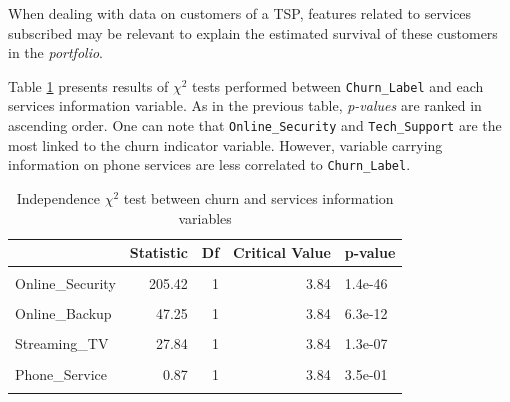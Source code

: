 \documentclass[
]{book}
\begin{document}
When dealing with data on customers of a TSP, features related to services subscribed may be relevant to explain the estimated survival of these customers in the \emph{portfolio}.

Table \ref{tab:chi2services} presents results of \(\chi^2\) tests performed between \texttt{Churn\_Label} and each services information variable. As in the previous table, \emph{p-values} are ranked in ascending order. One can note that \texttt{Online\_Security} and \texttt{Tech\_Support} are the most linked to the churn indicator variable. However, variable carrying information on phone services are less correlated to \texttt{Churn\_Label}.

\begin{table}[H]

\caption{\label{tab:chi2services}Independence $\chi^2$ test between churn and services information variables}
\centering
\begin{tabular}[t]{lrrrl}
\toprule
  & Statistic & Df & Critical Value & p-value\\
\midrule
\cellcolor{gray!6}{Internet\_Service} & \cellcolor{gray!6}{728.70} & \cellcolor{gray!6}{2} & \cellcolor{gray!6}{5.99} & \cellcolor{gray!6}{5.8e-159}\\
Online\_Security & 205.42 & 1 & 3.84 & 1.4e-46\\
\cellcolor{gray!6}{Tech\_Support} & \cellcolor{gray!6}{189.97} & \cellcolor{gray!6}{1} & \cellcolor{gray!6}{3.84} & \cellcolor{gray!6}{3.2e-43}\\
Online\_Backup & 47.25 & 1 & 3.84 & 6.3e-12\\
\cellcolor{gray!6}{Device\_Protection} & \cellcolor{gray!6}{30.50} & \cellcolor{gray!6}{1} & \cellcolor{gray!6}{3.84} & \cellcolor{gray!6}{3.3e-08}\\
\addlinespace
Streaming\_TV & 27.84 & 1 & 3.84 & 1.3e-07\\
\cellcolor{gray!6}{Streaming\_Movies} & \cellcolor{gray!6}{25.76} & \cellcolor{gray!6}{1} & \cellcolor{gray!6}{3.84} & \cellcolor{gray!6}{3.9e-07}\\
Phone\_Service & 0.87 & 1 & 3.84 & 3.5e-01\\
\cellcolor{gray!6}{Multiple\_Lines} & \cellcolor{gray!6}{0.87} & \cellcolor{gray!6}{1} & \cellcolor{gray!6}{3.84} & \cellcolor{gray!6}{3.5e-01}\\
\bottomrule
\end{tabular}
\end{table}
\end{document}
